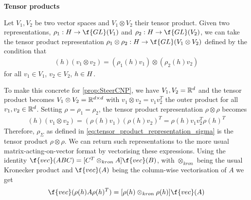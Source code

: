 \hypertarget{def:tensor_product}{\textbf{Tensor products}}

Let $V_1,V_2$ be two vector spaces and $V_1\otimes V_2$ their tensor product.
Given two representations, $\rho_1: \hrp \to \f{GL}(V_1)$ and $\rho_2: \hrp \to \f{GL}(V_2)$, we can take the tensor product representation $\rho_1 \otimes \rho_2: \hrp \to \f{GL}(V_1 \otimes V_2)$ defined by the condition that \begin{align} [\rho_1 \otimes \rho_2](h)(v_1 \otimes v_2) = (\rho_1(h)v_1) \otimes (\rho_2(h)v_2) \end{align} for all $v_1\in V_1$, $v_2\in V_2$, $h \in H$.

To make this concrete for \cref{prop:SteerCNP}, we have $V_1,V_2=\mathbb{R}^d$ and the tensor product becomes $V_1\otimes V_2=\mathbb{R}^{d\times d}$ with $v_1\otimes v_2=v_1v_2^T$ the outer product for all $v_1,v_2\in\mathbb{R}^d$.
Setting $\rho=\rho_1=\rho_2$, the tensor product representation $\rho\otimes\rho$ becomes \begin{align} [\rho\otimes\rho](h)(v_1\otimes v_2)=(\rho(h)v_1)(\rho(h)v_2)^T =\rho(h)v_1v_2^T\rho(h)^T \end{align} Therefore, $\rho_{\Sigma}$ as defined in \cref{eq:tensor_product_representation_sigma} is the tensor product $\rho\otimes\rho$.
We can return such representations to the more usual matrix-acting-on-vector format by vectorising these expressions.
Using the identity $\f{vec}(ABC) = [C^T \otimes_{kron} A] \f{vec}(B)$, with $\otimes_{kron}$ being the usual Kronecker product and $\f{vec}(A)$ being the column-wise vectorisation of $A$ we get \begin{align} \f{vec}(\rho(h) A \rho(h)^T) = [\rho(h) \otimes_{kron} \rho(h)] \f{vec}(A) \end{align} 


